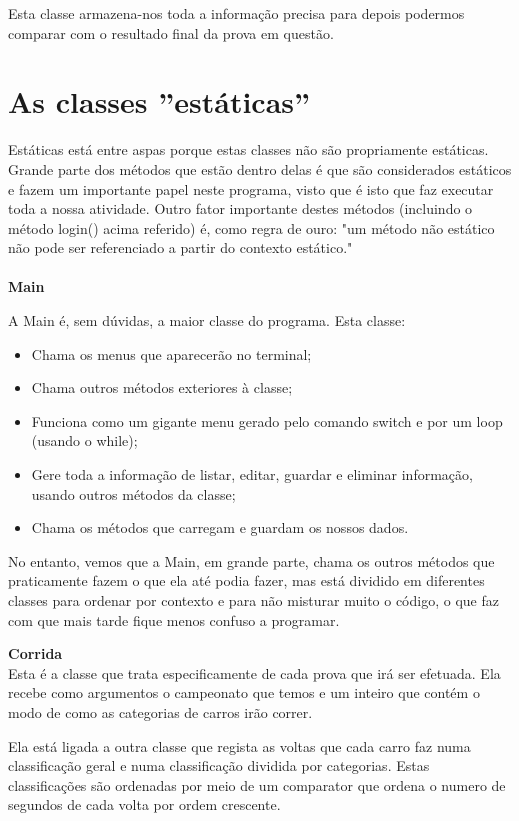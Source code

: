 \documentclass[10pt]{article}
\begin{document}
Esta classe armazena-nos toda a informação precisa para depois podermos comparar com o resultado final da prova em questão.

\pagebreak

\section{As classes ''estáticas''}

Estáticas está entre aspas porque estas classes não são propriamente estáticas. Grande parte dos métodos que estão dentro delas é que são considerados estáticos e fazem um importante papel neste programa, visto que é isto que faz executar toda a nossa atividade.
Outro fator importante destes métodos (incluindo o método login() acima referido) é, como regra de ouro: "um método não estático não pode ser referenciado a partir do contexto estático."
\\
\\

\textbf{Main}

A Main é, sem dúvidas, a maior classe do programa. Esta classe:

\begin{itemize}
\item Chama os menus que aparecerão no terminal;
\item Chama outros métodos exteriores à classe;
\item Funciona como um gigante menu gerado pelo comando switch e por um loop (usando o while);
\item Gere toda a informação de listar, editar, guardar e eliminar informação, usando outros métodos da classe;
\item Chama os métodos que carregam e guardam os nossos dados.
\end{itemize}

No entanto, vemos que a Main, em grande parte, chama os outros métodos que praticamente fazem o que ela até podia fazer, mas está dividido em diferentes classes para ordenar por contexto e para não misturar muito o código, o que faz com que mais tarde fique menos confuso a programar.

\textbf{Corrida}
\\
Esta é a classe que trata especificamente de cada prova que irá ser efetuada. Ela recebe como argumentos o campeonato que temos e um inteiro que contém o modo de como as categorias de carros irão correr.

Ela está ligada a outra classe que regista as voltas que cada carro faz numa classificação geral e numa classificação dividida por categorias. Estas classificações são ordenadas por meio de um comparator que ordena o numero de segundos de cada volta por ordem crescente.
\end{document}
